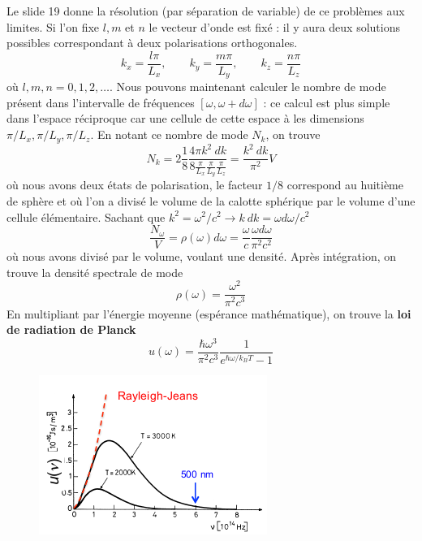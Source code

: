 	Le slide 19 donne la résolution (par séparation de variable) de ce problèmes aux limites. Si l'on fixe 
	$l,m$ et $n$ le vecteur d'onde est fixé : il y aura deux solutions possibles correspondant à deux 
	polarisations orthogonales. 
	\begin{equation}
	k_x = \frac{l\pi}{L_x},\qquad k_y = \frac{m\pi}{L_y}, \qquad k_z = \frac{n\pi}{L_z}
	\end{equation}
	où $l,m,n=0,1,2,\dots$. Nous pouvons maintenant calculer le nombre de mode présent dans l'intervalle 
	de fréquences $[\omega,\omega+d\omega]$ : ce calcul est plus simple dans l'espace réciproque car une 
	cellule de cette espace à les dimensions $\pi/L_x, \pi/L_y, \pi/L_z$. En notant ce nombre de mode $N_k$, 
	on trouve
	\begin{equation}
	N_k = 2\dfrac{1}{8}\dfrac{4\pi k^2\ dk}{8\frac{\pi}{L_x}\frac{\pi}{L_y}\frac{\pi}{L_z}} = \dfrac{k^2\ dk}
	{\pi^2}V
	\end{equation}
	où nous avons deux états de polarisation, le facteur $1/8$ correspond au huitième de sphère et où l'on a 
	divisé le volume de la calotte sphérique par le volume d'une cellule élémentaire. Sachant que $k^2 =
	\omega^2/c^2 \rightarrow k\ dk = \omega d\omega/c^2$
	\begin{equation}
	\frac{N_\omega}{V} = \rho(\omega)d\omega = \frac{\omega}{c}\frac{\omega d\omega}{\pi^2 c^2}
	\end{equation}
	où nous avons divisé par le volume, voulant une densité. Après intégration, on trouve la densité spectrale 
	de mode
	\begin{equation}
	\rho(\omega) = \dfrac{\omega^2}{\pi^2c^3}
	\end{equation}
	En multipliant par l'énergie moyenne (espérance mathématique), on trouve la \textbf{loi de radiation de 
	Planck}
	\begin{equation}
	u(\omega) = \dfrac{\hbar\omega^3}{\pi^2c^3}\dfrac{1}{e^{\hbar\omega/k_BT}-1}
	\end{equation}
	
	\begin{figure}
	\vspace{-5mm}
	\includegraphics[scale=0.65]{ch2/image10.png}
	\end{figure}
	
